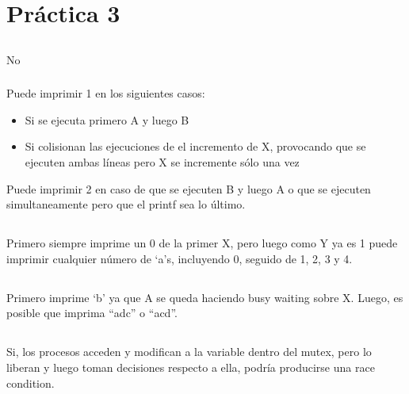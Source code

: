 \section{Práctica 3}

\subsection{}

\subsubsection{}

No

\subsubsection{}

Puede imprimir 1 en los siguientes casos:

\begin{itemize}
    \item Si se ejecuta primero A y luego B
    \item Si colisionan las ejecuciones de el incremento de X, provocando que
    se ejecuten ambas líneas pero X se incremente sólo una vez
\end{itemize}

Puede imprimir 2 en caso de que se ejecuten B y luego A o que se ejecuten
simultaneamente pero que el printf sea lo último.

\subsection{}

Primero siempre imprime un 0 de la primer X, pero luego como Y ya es 1 puede
imprimir cualquier número de `a's, incluyendo 0, seguido de 1, 2, 3 y 4.

\subsection{}

Primero imprime `b' ya que A se queda haciendo busy waiting sobre X. Luego, es
posible que imprima ``adc'' o ``acd''.

\subsection{}

Si, los procesos acceden y modifican a la variable dentro del mutex, pero lo
liberan y luego toman decisiones respecto a ella, podría producirse una race
condition.

